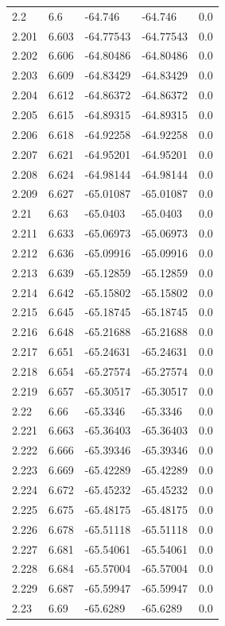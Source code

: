 \begin{tabular}{lllll}
2.2 & 6.6 & -64.746 & -64.746 & 0.0 \\
2.201 & 6.603 & -64.77543 & -64.77543 & 0.0 \\
2.202 & 6.606 & -64.80486 & -64.80486 & 0.0 \\
2.203 & 6.609 & -64.83429 & -64.83429 & 0.0 \\
2.204 & 6.612 & -64.86372 & -64.86372 & 0.0 \\
2.205 & 6.615 & -64.89315 & -64.89315 & 0.0 \\
2.206 & 6.618 & -64.92258 & -64.92258 & 0.0 \\
2.207 & 6.621 & -64.95201 & -64.95201 & 0.0 \\
2.208 & 6.624 & -64.98144 & -64.98144 & 0.0 \\
2.209 & 6.627 & -65.01087 & -65.01087 & 0.0 \\
2.21 & 6.63 & -65.0403 & -65.0403 & 0.0 \\
2.211 & 6.633 & -65.06973 & -65.06973 & 0.0 \\
2.212 & 6.636 & -65.09916 & -65.09916 & 0.0 \\
2.213 & 6.639 & -65.12859 & -65.12859 & 0.0 \\
2.214 & 6.642 & -65.15802 & -65.15802 & 0.0 \\
2.215 & 6.645 & -65.18745 & -65.18745 & 0.0 \\
2.216 & 6.648 & -65.21688 & -65.21688 & 0.0 \\
2.217 & 6.651 & -65.24631 & -65.24631 & 0.0 \\
2.218 & 6.654 & -65.27574 & -65.27574 & 0.0 \\
2.219 & 6.657 & -65.30517 & -65.30517 & 0.0 \\
2.22 & 6.66 & -65.3346 & -65.3346 & 0.0 \\
2.221 & 6.663 & -65.36403 & -65.36403 & 0.0 \\
2.222 & 6.666 & -65.39346 & -65.39346 & 0.0 \\
2.223 & 6.669 & -65.42289 & -65.42289 & 0.0 \\
2.224 & 6.672 & -65.45232 & -65.45232 & 0.0 \\
2.225 & 6.675 & -65.48175 & -65.48175 & 0.0 \\
2.226 & 6.678 & -65.51118 & -65.51118 & 0.0 \\
2.227 & 6.681 & -65.54061 & -65.54061 & 0.0 \\
2.228 & 6.684 & -65.57004 & -65.57004 & 0.0 \\
2.229 & 6.687 & -65.59947 & -65.59947 & 0.0 \\
2.23 & 6.69 & -65.6289 & -65.6289 & 0.0 \\

\end{tabular}
